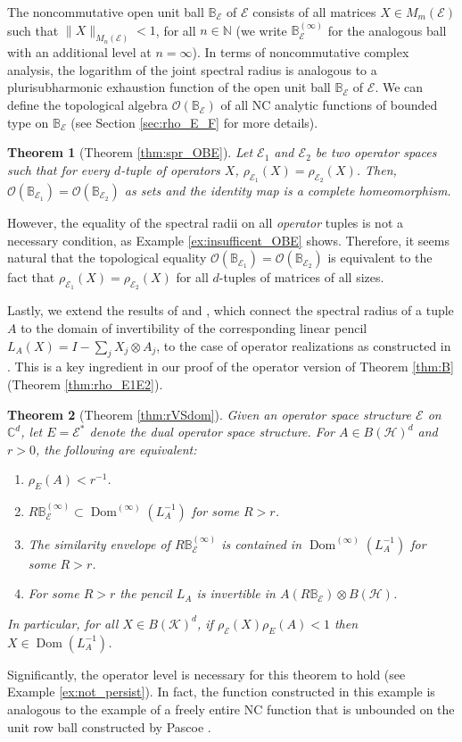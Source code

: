 \documentclass[12pt]{amsart}
\numberwithin{equation}{section}
\newtheorem{thmA}{Theorem}
\theoremstyle{definition}
\newcommand{\cE}{\mathcal{E}}
\newcommand{\cH}{\mathcal{H}}
\newcommand{\cK}{\mathcal{K}}
\newcommand{\cO}{\mathcal{O}}
\newcommand{\bB}{\mathbb{B}}
\newcommand{\bC}{\mathbb{C}}
\newcommand{\bN}{\mathbb{N}}
\newcommand{\dom}{\operatorname{Dom}}
\begin{document}
The noncommutative open unit ball $\bB_\cE$ of $\cE$ consists of all matrices $X \in M_m(\cE)$ such that $\|X\|_{M_n(\cE)}<1$, for all $n \in \bN$ (we write $\bB_\cE^{(\infty)}$ for the analogous ball with an additional level at $n = \infty$). 
In terms of noncommutative complex analysis, the logarithm of the joint spectral radius is analogous to a plurisubharmonic exhaustion function of the open unit ball $\bB_{\cE}$ of $\cE$. We can define  the topological algebra $\cO(\bB_{\cE})$ of all NC analytic functions of bounded type on $\bB_{\cE}$ (see Section \ref{sec:rho_E_F} for more details). 
\begin{thmA}[Theorem \ref{thm:spr_OBE}]
    Let $\cE_1$ and $\cE_2$ be two operator spaces such that for every $d$-tuple of operators $X$, $\rho_{\cE_1}(X) = \rho_{\cE_2}(X)$. Then, $\cO(\bB_{\cE_1}) = \cO(\bB_{\cE_2})$ as sets and the identity map is a complete homeomorphism.
\end{thmA}
However, the equality of the spectral radii on all {\em operator} tuples is not a necessary condition, as Example \ref{ex:insufficent_OBE} shows. Therefore, it seems natural that the topological equality $\cO(\bB_{\cE_1}) = \cO(\bB_{\cE_2})$ is equivalent to the fact that $\rho_{\cE_1}(X) = \rho_{\cE_2}(X)$ for all $d$-tuples of matrices of all sizes.

Lastly, we extend the results of \cite{JMS-rat} and \cite{shalsham2025spectral}, which connect the spectral radius of a tuple $A$ to the domain of invertibility of the corresponding linear pencil $L_A(X) = I - \sum_j X_j \otimes A_j$, to the case of operator realizations as constructed in \cite{augat2025operator}. This is a key ingredient in our proof of the operator version of Theorem \ref{thm:B} (Theorem \ref{thm:rho_E1E2}). 

\begin{thmA}[Theorem \ref{thm:rVSdom}]
    Given an operator space structure $\cE$ on $\bC^d$, let $E = \cE^*$ denote the dual operator space structure. 
    For $A \in B(\cH)^d$ and $r > 0$, the following are equivalent:
    \begin{enumerate}
        \item $\rho_E(A) < r^{-1}$. 
        \item $R\bB_\cE^{(\infty)}\subset \dom^{(\infty)}(L^{-1}_A)$ for some $R > r$. 
        \item The similarity envelope of $R\bB^{(\infty)}_\cE$ is contained in $\dom^{(\infty)}(L^{-1}_A)$ for some $R > r$.
        \item For some $R > r$ the pencil $L_A$ is invertible in $A(R\bB_\cE) \otimes B(\cH)$. 
    \end{enumerate}
    In particular, for all $X \in B(\cK)^d$, if $\rho_\cE(X) \rho_E(A) < 1$ then $X \in \dom(L_A^{-1})$.
\end{thmA}
Significantly, the operator level is necessary for this theorem to hold (see Example \ref{ex:not_persist}). In fact, the function constructed in this example is analogous to the example of a freely entire NC function that is unbounded on the unit row ball constructed by Pascoe \cite{Pascoe20}. 
\end{document}
